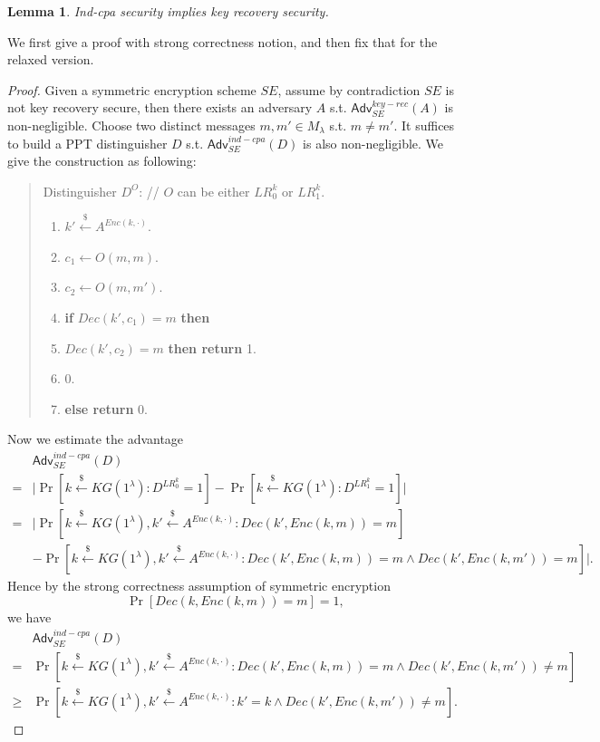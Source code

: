 \documentclass[12pt]{article}
\newcommand{\getsr}{\stackrel{\$}{\gets}}
\newcommand{\Adv}{\textsf{Adv}}
\newcommand{\tab}{\hspace{0.3in}}
\newtheorem{lemma}[theorem]{Lemma}
\theoremstyle{definition}
\begin{document}
\begin{lemma}
Ind-cpa security implies key recovery security.
\end{lemma}
We first give a proof with strong correctness notion, and then fix that for the relaxed version.
\begin{proof}
Given a symmetric encryption scheme $SE$, assume by contradiction $SE$ is not key recovery secure, then there exists an adversary $A$ s.t. $\Adv_{SE}^{key-rec}(A)$ is non-negligible. Choose two distinct messages $m, m' \in M_\lambda$ s.t. $m \not= m'$. It suffices to build a PPT distinguisher $D$ s.t. $\Adv_{SE}^{ind-cpa}(D)$ is also non-negligible. We give the construction as following:
\begin{quote}
Distinguisher $D^O$: // $O$ can be either $LR_0^k$ or $LR_1^k$.
\begin{enumerate}
\item $k' \getsr A^{Enc(k,\cdot)}$.
\item $c_1 \gets O(m, m)$.
\item $c_2 \gets O(m, m')$.
\item {\bf if} $Dec(k', c_1) = m$ {\bf then } 
\item \tab {\bf if} $Dec(k', c_2) = m$ {\bf then return} 1.
\item \tab {\bf else return} 0.
\item {\bf else return} 0.
\end{enumerate}
\end{quote}
Now we estimate the advantage
$$\begin{aligned}
&\Adv_{SE}^{ind-cpa}(D) \\
=& \bigg| \Pr[k \getsr KG(1^\lambda) : D^{LR_0^k}=1] - \Pr[k \getsr KG(1^\lambda) : D^{LR_1^k}=1] \bigg| \\
=& \bigg| \Pr[k \getsr KG(1^\lambda), k' \getsr A^{Enc(k,\cdot)}: Dec(k', Enc(k, m))=m] \\
&-\Pr[k \getsr KG(1^\lambda), k' \getsr A^{Enc(k,\cdot)}: Dec(k', Enc(k, m))=m \wedge Dec(k', Enc(k, m'))=m] \bigg|.
\end{aligned}$$
Hence by the strong correctness assumption of symmetric encryption 
$$\Pr[Dec(k, Enc(k, m))=m]=1,$$ 
we have
$$\begin{aligned}
&\Adv_{SE}^{ind-cpa}(D) \\
=& \Pr[k \getsr KG(1^\lambda), k' \getsr A^{Enc(k,\cdot)}: Dec(k', Enc(k, m))=m \wedge Dec(k', Enc(k, m'))\not=m] \\
\geq & \Pr[k \getsr KG(1^\lambda), k' \getsr A^{Enc(k,\cdot)}: k' = k \wedge Dec(k', Enc(k, m'))\not=m].

\end{aligned}$$
\end{proof}
\end{document}
